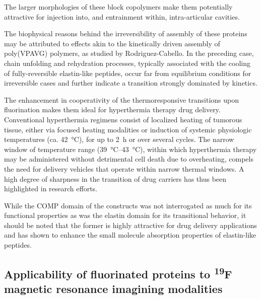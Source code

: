 \begin{refsection}
\begin{figure}[h!]
\label{fig:irreversible_delivery} \end{figure}
The larger morphologies of these block copolymers make them potentially attractive
for injection into, and entrainment within, intra-articular
cavities.\cite{Nettles2008,Betre2006a}

The biophysical reasons behind the irreversibility of assembly of these proteins
may be attributed to effects akin to the kinetically driven assembly of
poly(VPAVG) polymers, as studied by Rodriguez-Cabello.\cite{Reguera2003} In the
preceding case, chain unfolding and rehydration processes, typically associated
with the cooling of fully-reversible elastin-like peptides, occur far from
equilibrium conditions for irreversible cases and further indicate a transition
strongly dominated by kinetics.

The enhancement in cooperativity of the thermoresponsive transitions upon
fluorination makes them ideal for hyperthermia therapy drug
delivery.\cite{Furgeson2006} Conventional hyperthermia regimens consist of
localized heating of tumorous tissue, either via focused heating modalities or
induction of systemic physiologic temperatures (ca. \SI{42}{\celsius}), for up
to \SI{2}{\hour} or over several cycles.\cite{Chilkoti2002a,Dreher2007a}
The narrow window of temperature range (\SIrange{39}{43}{\celsius}), within which
hyperthermia therapy may be administered without detrimental cell death due to
overheating, compels the need for delivery vehicles that operate within narrow
thermal windows. A high degree of sharpness in the transition of drug carriers
has thus been highlighted in research efforts.\cite{Nakayama2010,Mackay2008} 

While the COMP domain of the constructs was not interrogated as much for its
functional properties as was the elastin domain for its transitional behavior,
it should be noted that the former is highly attractive for drug delivery
applications and has shown to enhance the small molecule absorption properties
of elastin-like peptides.\cite{Haghpanah2010}

\subsection{Applicability of fluorinated proteins to \textsuperscript{19}F
\label{sec:pff_app_mri}
magnetic resonance imagining modalities} 


\end{refsection}
